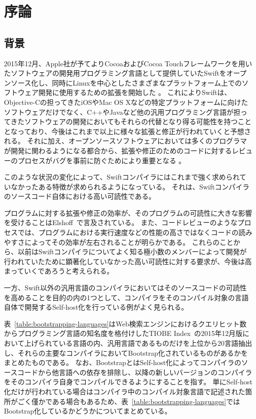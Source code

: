 \chapter{序論}
\label{introduction}

\section{背景}
\label{introduction:background}

2015年12月、Apple社が予てよりCocoaおよびCocoa Touchフレームワークを用いたソフトウェアの開発用プログラミング言語として提供していたSwiftをオープンソース化し、同時にLinuxを中心としたさまざまなプラットフォーム上でのソフトウェア開発に使用するための拡張を開始した
。
これによりSwiftは、Objective-Cの担ってきたiOSやMac OS Xなどの特定プラットフォームに向けたソフトウェアだけでなく、C++やJavaなど他の汎用プログラミング言語が担ってきたソフトウェアの開発においてもそれらの代替となり得る可能性を持つこととなっており、今後はこれまで以上に様々な拡張と修正が行われていくと予想される。
それに加え、オープンソースソフトウェアにおいては多くのプログラマが開発に関わるようになる都合から、拡張や修正のためのコードに対するレビューのプロセスがバグを事前に防ぐためにより重要となる
。

このような状況の変化によって、Swiftコンパイラにはこれまで強く求められていなかったある特徴が求められるようになっている。
それは、Swiftコンパイラのソースコード自体における高い可読性である。

プログラムに対する拡張や修正の効率が、そのプログラムの可読性に大きな影響を受けることはElshoff~\cite{elshoff}で言及されている。
また、コードレビューのようなプロセスでは、プログラムにおける実行速度などの性能の高さではなくコードの読みやすさによってその効率が左右されることが明らかである。
これらのことから、以前はSwiftコンパイラについてよく知る極小数のメンバーによって開発が行われていたために顕著化していなかった高い可読性に対する要求が、今後は高まっていくであろうと考えられる。

一方、Swift以外の汎用言語のコンパイラにおいてはそのソースコードの可読性を高めることを目的の内の1つとして、コンパイラをそのコンパイル対象の言語自体で開発するSelf-host化を行っている例がよく見られる。

表~\ref{table:bootstrapping-languages}はWeb検索エンジンにおけるクエリヒット数からプログラミング言語の知名度を格付けしたTIOBE Index~\cite{tiobe}の2015年12月版において上げられている言語の内、汎用言語であるものだけを上位から20言語抽出し、それらの主要なコンパイラにおいてBootstrap化されているものがあるかをまとめたものである。
なお、BootstrapとはSelf-host化によってコンパイラのソースコードから他言語への依存を排除し、以降の新しいバージョンのコンパイラをそのコンパイラ自身でコンパイルできるようにすることを指す。
単にSelf-host化だけが行われている場合はコンパイラ中のコンパイル対象言語で記述された箇所がごく僅かである場合もあるため、表~\ref{table:bootstrapping-languages}ではBootstrap化しているかどうかについてまとめている。

